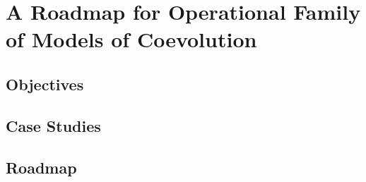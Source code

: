 



\chapter{A Roadmap for Operational Family of Models of Coevolution} %

\label{ch:operational} 










\section{Objectives}







\section{Case Studies}









\section{Roadmap}



